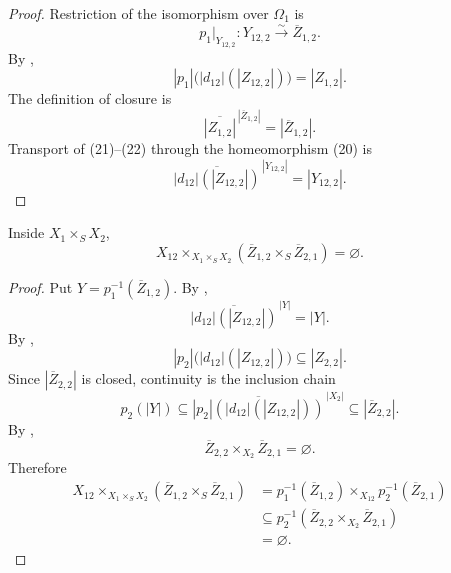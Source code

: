 \begin{proof}
  Restriction of the isomorphism over $\Omega_1$ is
  \[
    p_1|_{Y_{12,2}}\colon
      Y_{12,2}\xrightarrow{\sim}\overline Z_{1,2}.                 \tag{20}
  \]
  By ,
  \[
    |p_1|\bigl(|d_{12}|(|Z_{12,2}|)\bigr)=|Z_{1,2}|.              \tag{21}
  \]
  The definition of closure is
  \[
    \overline{|Z_{1,2}|}^{\,|\overline Z_{1,2}|}
      =|\overline Z_{1,2}|.                                      \tag{22}
  \]
  Transport of (21)--(22) through the homeomorphism (20) is
  \[
    \overline{|d_{12}|(|Z_{12,2}|)}^{\,|Y_{12,2}|}=|Y_{12,2}|.
  \]
\end{proof}

\begin{lemma}
  \label{lemma:nagata-key-boundary-disjointness}
  \lean{}

  Inside $X_1\times_SX_2$,
  \[
    X_{12}\times_{X_1\times_SX_2}
      (\overline Z_{1,2}\times_S\overline Z_{2,1})
    =\varnothing.
  \]
\end{lemma}

\begin{proof}
  Put $Y=p_1^{-1}(\overline Z_{1,2})$.  By
  ,
  \[
    \overline{|d_{12}|(|Z_{12,2}|)}^{\,|Y|}=|Y|.                  \tag{23}
  \]
  By ,
  \[
    |p_2|\bigl(|d_{12}|(|Z_{12,2}|)\bigr)\subseteq|Z_{2,2}|.      \tag{24}
  \]
  Since $|\overline Z_{2,2}|$ is closed, continuity is the inclusion chain
  \[
    p_2(|Y|)
      \subseteq
      \overline{|p_2|(|d_{12}|(|Z_{12,2}|))}^{\,|X_2|}
      \subseteq|\overline Z_{2,2}|.                               \tag{25}
  \]
  By ,
  \[
    \overline Z_{2,2}\times_{X_2}\overline Z_{2,1}=\varnothing.   \tag{26}
  \]
  Therefore
  \[
  \begin{aligned}
    X_{12}\times_{X_1\times_SX_2}
      (\overline Z_{1,2}\times_S\overline Z_{2,1})
      &=
        p_1^{-1}(\overline Z_{1,2})
          \times_{X_{12}}
        p_2^{-1}(\overline Z_{2,1})\\
      &\subseteq
        p_2^{-1}(
          \overline Z_{2,2}\times_{X_2}\overline Z_{2,1})\\
      &=\varnothing.
  \end{aligned}
  \]
\end{proof}

